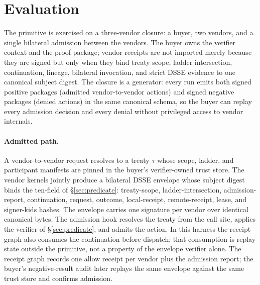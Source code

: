 \section{Evaluation}
\label{sec:evaluation}

The primitive is exercised on a three-vendor closure: a buyer, two vendors, and a single bilateral admission between the vendors. The buyer owns the verifier context and the proof package; vendor receipts are not imported merely because they are signed but only when they bind treaty scope, ladder intersection, continuation, lineage, bilateral invocation, and strict DSSE evidence to one canonical subject digest. The closure is a generator: every run emits both signed positive packages (admitted vendor-to-vendor actions) and signed negative packages (denied actions) in the same canonical schema, so the buyer can replay every admission decision and every denial without privileged access to vendor internals.

\paragraph{Admitted path.} A vendor-to-vendor request resolves to a treaty $\tau$ whose scope, ladder, and participant manifests are pinned in the buyer's verifier-owned trust store. The vendor kernels jointly produce a bilateral DSSE envelope whose subject digest binds the ten-field  of \S\ref{sec:predicate}: treaty-scope, ladder-intersection, admission-report, continuation, request, outcome, local-receipt, remote-receipt, lease, and signer-kids hashes. The envelope carries one signature per vendor over identical canonical bytes. The admission hook resolves the treaty from the call site, applies the verifier of \S\ref{sec:predicate}, and admits the action. In this harness the receipt graph also consumes the continuation before dispatch; that consumption is replay state outside the primitive, not a property of the envelope verifier alone. The receipt graph records one allow receipt per vendor plus the admission report; the buyer's negative-result audit later replays the same envelope against the same trust store and confirms admission.

